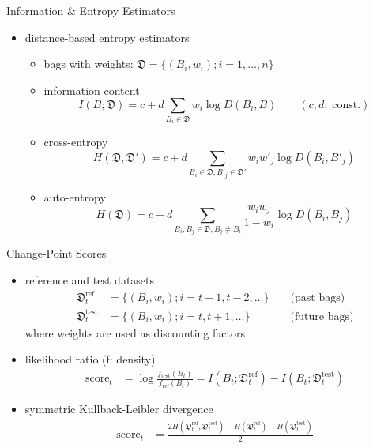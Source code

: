 \documentclass[fleqn,aspectratio=1610]{beamer}
\begin{document}
\begin{frame}[label={sec:orgbc5fb2a}]{Information \& Entropy Estimators}
\begin{itemize}
\item distance-based entropy estimators

\nocite{HinoMurata2013}
\begin{itemize}
\item bags with weights: \(\mathfrak{D}=\{(B_i,w_i);i=1,\dotsc,n\}\)
\item information content
\begin{equation}
  I(B;\mathfrak{D})
  =c+d\sum_{B_i\in\mathfrak{D}}w_i\log D(B_i,B)
  \qquad(c,d:\;\text{const.})
\end{equation}
\item cross-entropy
\begin{equation}
  H(\mathfrak{D},\mathfrak{D}')
  =c+d\sum_{B_i\in\mathfrak{D},B'_j\in\mathfrak{D}'}
  w_iw'_j\log D(B_i,B'_j)
\end{equation}
\item auto-entropy
\begin{equation}
  H(\mathfrak{D})
  =c+d\sum_{B_i,B_j\in\mathfrak{D},B_j\not=B_i}
  \frac{w_iw_j}{1-w_i}\log D(B_i,B_j)
\end{equation}
\end{itemize}
\end{itemize}
\end{frame}

\begin{frame}[label={sec:org5bf7112}]{Change-Point Scores}
\begin{itemize}
\item reference and test datasets
\begin{align}
 \mathfrak{D}_{t}^{\mathrm{ref}}
 &=\{(B_i,w_i);i=t-1,t-2,\dotsc\}
  &&\text{ (past bags)}
 \\
 \mathfrak{D}_{t}^{\mathrm{test}}
 &=\{(B_i,w_i);i=t,t+1,\dotsc\}
  &&\text{ (future bags)}
\end{align}
where weights are used as discounting factors
\item likelihood ratio (f: density)
\begin{align}
 \mathrm{score}_{t}
 &=\log\frac{f_{\mathrm{test}}(B_t)}{f_{\mathrm{ref}}(B_t)}
 =I(B_t;\mathfrak{D}_{t}^{\mathrm{ref}})
 -I(B_t;\mathfrak{D}_{t}^{\mathrm{test}})
\end{align}
\item symmetric Kullback-Leibler divergence
\begin{align}
  \mathrm{score}_{t}
  &=\frac{2H(\mathfrak{D}_{t}^{\mathrm{ref}},\mathfrak{D}_{t}^{\mathrm{test}})
   -H(\mathfrak{D}_{t}^{\mathrm{ref}})-H(\mathfrak{D}_{t}^{\mathrm{test}})}{2}
\end{align}
\end{itemize}
\end{frame}
\end{document}

